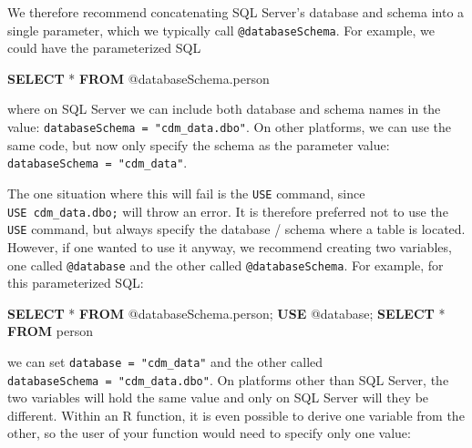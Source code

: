 \documentclass[]{article}
\newenvironment{Shaded}{\begin{snugshade}}{\end{snugshade}}
\newcommand{\KeywordTok}[1]{\textcolor[rgb]{0.13,0.29,0.53}{\textbf{#1}}}
\newcommand{\NormalTok}[1]{#1}
\begin{document}
We therefore recommend concatenating SQL Server's database and schema
into a single parameter, which we typically call
\texttt{@databaseSchema}. For example, we could have the parameterized
SQL

\begin{Shaded}
\begin{Highlighting}[]
\KeywordTok{SELECT}\NormalTok{ * }\KeywordTok{FROM}\NormalTok{ @databaseSchema.person}
\end{Highlighting}
\end{Shaded}

where on SQL Server we can include both database and schema names in the
value: \texttt{databaseSchema\ =\ "cdm\_data.dbo"}. On other platforms,
we can use the same code, but now only specify the schema as the
parameter value: \texttt{databaseSchema\ =\ "cdm\_data"}.

The one situation where this will fail is the \texttt{USE} command,
since \texttt{USE\ cdm\_data.dbo;} will throw an error. It is therefore
preferred not to use the \texttt{USE} command, but always specify the
database / schema where a table is located. However, if one wanted to
use it anyway, we recommend creating two variables, one called
\texttt{@database} and the other called \texttt{@databaseSchema}. For
example, for this parameterized SQL:

\begin{Shaded}
\begin{Highlighting}[]
\KeywordTok{SELECT}\NormalTok{ * }\KeywordTok{FROM}\NormalTok{ @databaseSchema.person;}
\KeywordTok{USE}\NormalTok{ @database;}
\KeywordTok{SELECT}\NormalTok{ * }\KeywordTok{FROM}\NormalTok{ person}
\end{Highlighting}
\end{Shaded}

we can set \texttt{database\ =\ "cdm\_data"} and the other called
\texttt{databaseSchema\ =\ "cdm\_data.dbo"}. On platforms other than SQL
Server, the two variables will hold the same value and only on SQL
Server will they be different. Within an R function, it is even possible
to derive one variable from the other, so the user of your function
would need to specify only one value:
\end{document}
